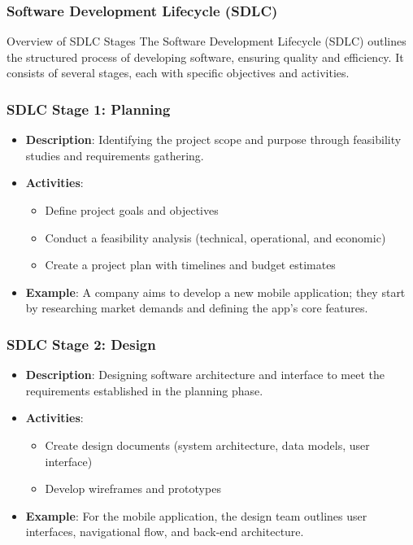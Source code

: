 \documentclass{beamer}
\begin{document}
\begin{frame}[fragile]
    \frametitle{Software Development Lifecycle (SDLC)}
    \begin{block}{Overview of SDLC Stages}
    The Software Development Lifecycle (SDLC) outlines the structured process of developing software, ensuring quality and efficiency. It consists of several stages, each with specific objectives and activities.
    \end{block}
\end{frame}

\begin{frame}[fragile]
    \frametitle{SDLC Stage 1: Planning}
    \begin{itemize}
        \item \textbf{Description}: Identifying the project scope and purpose through feasibility studies and requirements gathering.
        \item \textbf{Activities}:
        \begin{itemize}
            \item Define project goals and objectives
            \item Conduct a feasibility analysis (technical, operational, and economic)
            \item Create a project plan with timelines and budget estimates
        \end{itemize}
        \item \textbf{Example}: A company aims to develop a new mobile application; they start by researching market demands and defining the app’s core features.
    \end{itemize}
\end{frame}

\begin{frame}[fragile]
    \frametitle{SDLC Stage 2: Design}
    \begin{itemize}
        \item \textbf{Description}: Designing software architecture and interface to meet the requirements established in the planning phase.
        \item \textbf{Activities}:
        \begin{itemize}
            \item Create design documents (system architecture, data models, user interface)
            \item Develop wireframes and prototypes
        \end{itemize}
        \item \textbf{Example}: For the mobile application, the design team outlines user interfaces, navigational flow, and back-end architecture.
    \end{itemize}
\end{frame}
\end{document}
